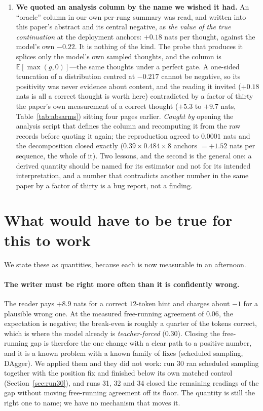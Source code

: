 \documentclass{article} %
\begin{document}
\begin{enumerate}
\item \textbf{We quoted an analysis column by the name we wished it had.} An ``oracle'' column in our own per-rung summary was read, and written into this paper's abstract and its central negative, as \emph{the value of the true continuation} at the deployment anchors: $+0.18$ nats per thought, against the model's own $-0.22$. It is nothing of the kind. The probe that produces it splices only the model's own sampled thoughts, and the column is $\mathbb{E}[\max(g,0)]$---the same thoughts under a perfect gate. A one-sided truncation of a distribution centred at $-0.217$ cannot be negative, so its positivity was never evidence about content, and the reading it invited ($+0.18$ nats is all a correct thought is worth here) contradicted by a factor of thirty the paper's own measurement of a correct thought ($+5.3$ to $+9.7$ nats, Table~\ref{tab:absarms}) sitting four pages earlier. \emph{Caught by} opening the analysis script that defines the column and recomputing it from the raw records before quoting it again; the reproduction agreed to $0.0001$ nats and the decomposition closed exactly ($0.39 \times 0.484 \times 8$ anchors $= +1.52$ nats per sequence, the whole of it). Two lessons, and the second is the general one: a derived quantity should be named for its estimator and not for its intended interpretation, and a number that contradicts another number in the same paper by a factor of thirty is a bug report, not a finding.
\end{enumerate}

\section{What would have to be true for this to work}
\label{sec:whatwouldwork}

We state these as quantities, because each is now measurable in an afternoon.

\paragraph{The writer must be right more often than it is confidently wrong.} The reader pays $+8.9$ nats for a correct $12$-token hint and charges about $-1$ for a plausible wrong one. At the measured free-running agreement of $0.06$, the expectation is negative; the break-even is roughly a quarter of the tokens correct, which is where the model already is \emph{teacher-forced} ($0.30$). Closing the free-running gap is therefore the one change with a clear path to a positive number, and it is a known problem with a known family of fixes (scheduled sampling, DAgger). We applied them and they did not work: run 30 ran scheduled sampling together with the position fix and finished below its own matched control (Section~\ref{sec:run30}), and runs 31, 32 and 34 closed the remaining readings of the gap without moving free-running agreement off its floor. The quantity is still the right one to name; we have no mechanism that moves it.
\end{document}
